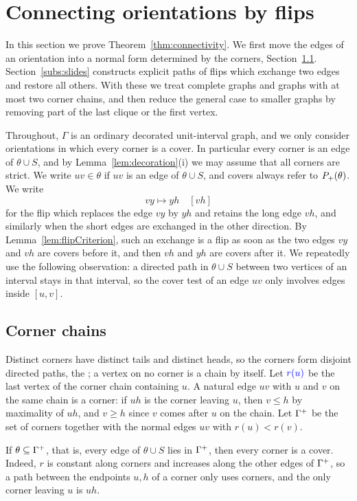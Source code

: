 \section{Connecting orientations by flips}\label{sec:connectivity}

In this section we prove Theorem~\ref{thm:connectivity}.
We first move the edges of an orientation into a normal form determined by the
corners, Section~\ref{subs:preparation}.
Section~\ref{subs:slides} constructs explicit paths of flips which exchange two
edges and restore all others.
With these we treat complete graphs and graphs with at most two corner chains,
and then reduce the general case to smaller graphs by removing part of the
last clique or the first vertex.

Throughout, $\Gamma$ is an ordinary decorated unit-interval graph, and we only
consider orientations in which every corner is a cover.
In particular every corner is an edge of $\theta\cup S$, and by
Lemma~\ref{lem:decoration}(i) we may assume that all corners are strict.
We write $uv\in\theta$ if $uv$ is an edge of $\theta\cup S$, and covers always
refer to $P_{+}(\theta)$.
We write
\[
 vy\mapsto yh\quad[vh]
\]
for the flip which replaces the edge $vy$ by $yh$ and retains the long edge
$vh$, and similarly when the short edges are exchanged in the other direction.
By Lemma~\ref{lem:flipCriterion}, such an exchange is a flip as soon as the two
edges $vy$ and $vh$ are covers before it, and then $vh$ and $yh$ are covers
after it.
We repeatedly use the following observation: a directed path in $\theta\cup S$
between two vertices of an interval stays in that interval, so the cover test
of an edge $uv$ only involves edges inside $[u,v]$.

\subsection{Corner chains}\label{subs:preparation}

Distinct corners have distinct tails and distinct heads, so the corners form
disjoint directed paths, the ; a vertex on no corner is a
chain by itself.
Let $\defin{r(u)}$ be the last vertex of the corner chain containing $u$.
A natural edge $uv$ with $u$ and $v$ on the same chain is a corner: if $uh$ is
the corner leaving $u$, then $v\leq h$ by maximality of $uh$, and $v\geq h$
since $v$ comes after $u$ on the chain.
Let $\Gamma^{+}$ be the set of corners together with the normal edges $uv$ with
$r(u)<r(v)$.

If $\theta\subseteq\Gamma^{+}$, that is, every edge of $\theta\cup S$ lies in
$\Gamma^{+}$, then every corner is a cover.
Indeed, $r$ is constant along corners and increases along the other edges of
$\Gamma^{+}$, so a path between the endpoints $u,h$ of a corner only uses corners,
and the only corner leaving $u$ is $uh$.

